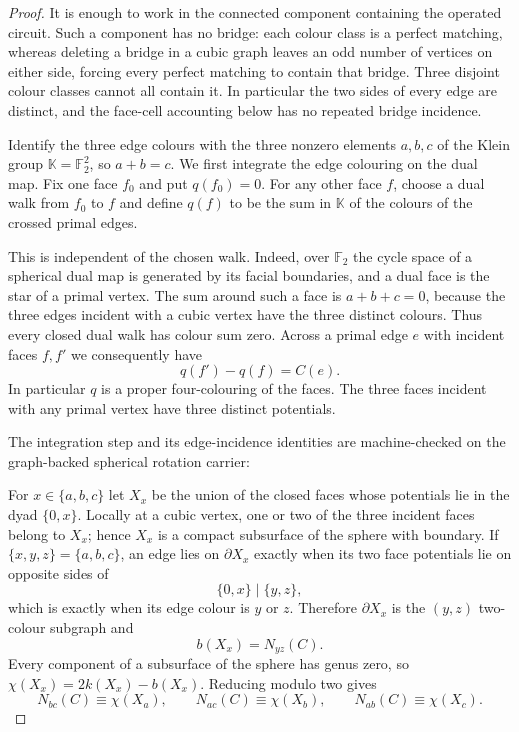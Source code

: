 \begin{proof}
It is enough to work in the connected component containing the operated
circuit.  Such a component has no bridge: each colour class is a perfect
matching, whereas deleting a bridge in a cubic graph leaves an odd number
of vertices on either side, forcing every perfect matching to contain that
bridge.  Three disjoint colour classes cannot all contain it.  In particular
the two sides of every edge are distinct, and the face-cell accounting below
has no repeated bridge incidence.

Identify the three edge colours with the three nonzero elements
$a,b,c$ of the Klein group
$\mathbb K=\mathbb F_2^2$, so $a+b=c$.  We first integrate the edge
colouring on the dual map.  Fix one face $f_0$ and put $q(f_0)=0$.  For any
other face $f$, choose a dual walk from $f_0$ to $f$ and define $q(f)$ to be
the sum in $\mathbb K$ of the colours of the crossed primal edges.

This is independent of the chosen walk.  Indeed, over $\mathbb F_2$ the
cycle space of a spherical dual map is generated by its facial boundaries,
and a dual face is the star of a primal vertex.  The sum around such a face
is $a+b+c=0$, because the three edges incident with a cubic vertex have the
three distinct colours.  Thus every closed dual walk has colour sum zero.
Across a primal edge $e$ with incident faces $f,f'$ we consequently have
\[
                   q(f')-q(f)=C(e).
\]
In particular $q$ is a proper four-colouring of the faces.  The three faces
incident with any primal vertex have three distinct potentials.

The integration step and its edge-incidence identities are machine-checked
on the graph-backed spherical rotation carrier:

For $x\in\{a,b,c\}$ let $X_x$ be the union of the closed faces whose
potentials lie in the dyad $\{0,x\}$.  Locally at a cubic vertex, one or two
of the three incident faces belong to $X_x$; hence $X_x$ is a compact
subsurface of the sphere with boundary.  If $\{x,y,z\}=\{a,b,c\}$, an edge
lies on $\partial X_x$ exactly when its two face potentials lie on opposite
sides of
\[
                 \{0,x\}\mid\{y,z\},
\]
which is exactly when its edge colour is $y$ or $z$.  Therefore
$\partial X_x$ is the $(y,z)$ two-colour subgraph and
\[
                 b(X_x)=N_{yz}(C).
\]
Every component of a subsurface of the sphere has genus zero, so
$\chi(X_x)=2k(X_x)-b(X_x)$.  Reducing modulo two gives
\[
 N_{bc}(C)\equiv\chi(X_a),\qquad
 N_{ac}(C)\equiv\chi(X_b),\qquad
 N_{ab}(C)\equiv\chi(X_c).                     \tag{1}
\]


\end{proof}
